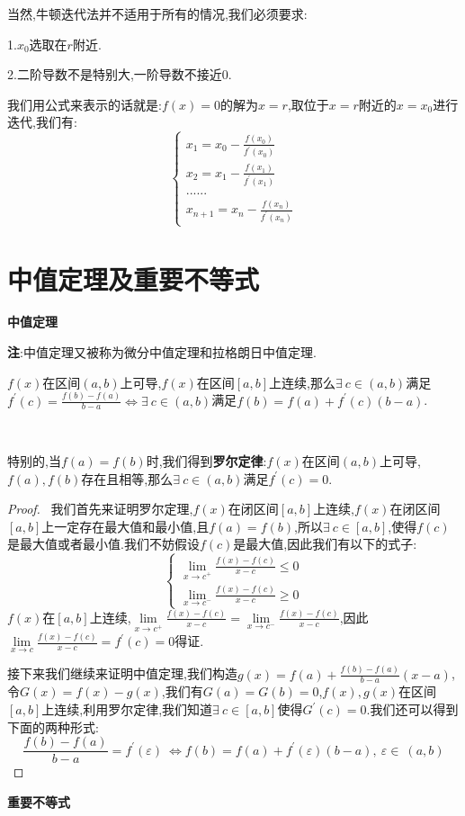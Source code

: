 \documentclass[oneside]{book}
\begin{document}
	当然,牛顿迭代法并不适用于所有的情况,我们必须要求:
	
	1.$x_{0}$选取在$r$附近.
	
	2.二阶导数不是特别大,一阶导数不接近0.
	
	我们用公式来表示的话就是:$f(x)=0$的解为$x=r$,取位于$x=r$附近的$x=x_{0}$进行迭代,我们有:
	\begin{equation}
		\left\{\begin{array}{c}
			x_{1}=x_{0}-\frac{f(x_{0})}{f^{'}(x_{0})}\\	x_{2}=x_{1}-\frac{f(x_{1})}{f^{'}(x_{1})}\\......\\	x_{n+1}=x_{n}-\frac{f(x_{n})}{f^{'}(x_{n})}
		\end{array}\right.
	\end{equation}
	\chapter{中值定理及重要不等式}
	\textbf{中值定理}
	
	\textbf{注}:中值定理又被称为微分中值定理和拉格朗日中值定理.
	
	$f(x)$在区间$(a,b)$上可导,$f(x)$在区间$[a,b]$上连续,那么$\exists\ c\in (a,b)$满足$f^{'}(c)=\frac{f(b)-f(a)}{b-a}\Leftrightarrow $$\exists\ c\in (a,b)$满足$f(b)=f(a)+f^{'}(c)(b-a)$.
	
	\hspace{\fill}\
	
	特别的,当$f(a)=f(b)$时,我们得到\textbf{罗尔定律}:$f(x)$在区间$(a,b)$上可导,$f(a),f(b)$存在且相等,那么$\exists\ c\in (a,b)$满足$f^{'}(c)=0$.
	
	
	\begin{proof}
		\hspace{\fill}\
		我们首先来证明罗尔定理,$f(x)$在闭区间$[a,b]$上连续,$f(x)$在闭区间$[a,b]$上一定存在最大值和最小值,且$f(a)=f(b)$,所以$\exists\ c\in [a,b]$,使得$f(c)$是最大值或者最小值.我们不妨假设$f(c)$是最大值,因此我们有以下的式子:
		$$\left\{\begin{array}{c}
			\lim\limits_{x\rightarrow c^{+}}\frac{f(x)-f(c)}{x-c}\le 0\\\lim\limits_{x\rightarrow c^{-}}\frac{f(x)-f(c)}{x-c}\geq 0
		\end{array}\right.$$
		$f(x)$在$[a,b]$上连续,$\lim\limits_{x\rightarrow c^{+}}\frac{f(x)-f(c)}{x-c}=\lim\limits_{x\rightarrow c^{-}}\frac{f(x)-f(c)}{x-c}$,因此$\lim\limits_{x\rightarrow c}\frac{f(x)-f(c)}{x-c}=f^{'}(c)=0$得证.
		
		接下来我们继续来证明中值定理,我们构造$g(x)=f(a)+\frac{f(b)-f(a)}{b-a}(x-a)$,令$G(x)=f(x)-g(x)$,我们有$G(a)=G(b)=0$,$f(x),g(x)$在区间$[a,b]$上连续,利用罗尔定律,我们知道$\exists\ c\in [a,b]$使得$G^{'}(c)=0$.我们还可以得到下面的两种形式:
		$$\frac{f(b)-f(a)}{b-a}=f^{'}(\varepsilon)\ \Leftrightarrow f(b)=f(a)+f^{'}(\varepsilon)(b-a),\ \varepsilon \in \ (a,b)$$
	\end{proof}
	\textbf{重要不等式}
	
\end{document}
